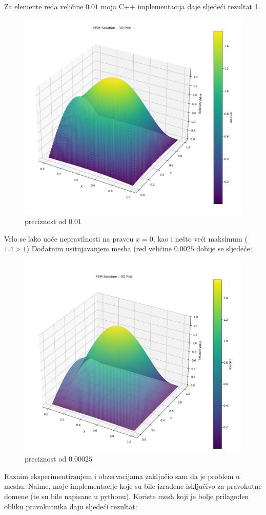 \documentclass[zavrsnirad]{../fer}
\begin{document}
\newpage
Za elemente reda veličine $0.01$ moja C++ implementacija daje sljedeći 
rezultat \ref{numerSinSin001}.
\begin{figure}[H]
	\centering
  \includegraphics[width=1.2\linewidth]{Figures/numersinsin001.png}
	\caption{preciznost od $0.01$}
  \label{numerSinSin001}
\end{figure}
\newpage
Vrlo se lako uoče nepravilnosti na pravcu $x=0$, 
kao i nešto veći maksimum ($1.4 > 1$)
Dodatnim usitnjavanjem mesha (red veličine $0.0025$
dobije se sljedeće:
\begin{figure}[H]
	\centering
	\includegraphics[width=1.2\linewidth]{Figures/numersinsin00025.png}
	\caption{preciznost od $0.00025$}
  \label{numerSinSin00025}
\end{figure}
\newpage
Raznim eksperimentiranjem i obzervacijama zaključio sam da je problem
u meshu. Naime, moje implementacije koje su bile izrađene isključivo 
za pravokutne domene (te su bile napisane u pythonu). Koriste mesh 
koji je bolje prilagođen obliku pravokutnika daju sljedeći rezultat:
\end{document}
